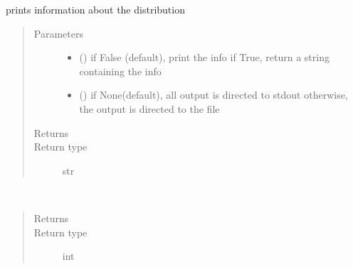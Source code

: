 \documentclass[letterpaper,10pt,english]{sphinxmanual}
\begin{document}
\begin{fulllineitems}
\begin{fulllineitems}
\label{\detokenize{Reference:salabim.Poisson.print_info}}
prints information about the distribution
\begin{quote}\begin{description}
\item[{Parameters}] \leavevmode\begin{itemize}
\item {} 
 () \textendash{} if False (default), print the info
if True, return a string containing the info

\item {} 
 () \textendash{} if None(default), all output is directed to stdout 
otherwise, the output is directed to the file

\end{itemize}

\item[{Returns}] \leavevmode
{}

\item[{Return type}] \leavevmode
str

\end{description}\end{quote}

\end{fulllineitems}


\begin{fulllineitems}
\label{\detokenize{Reference:salabim.Poisson.sample}}~\begin{quote}\begin{description}
\item[{Returns}] \leavevmode
{}

\item[{Return type}] \leavevmode
int

\end{description}\end{quote}

\end{fulllineitems}


\end{fulllineitems}
\end{document}

